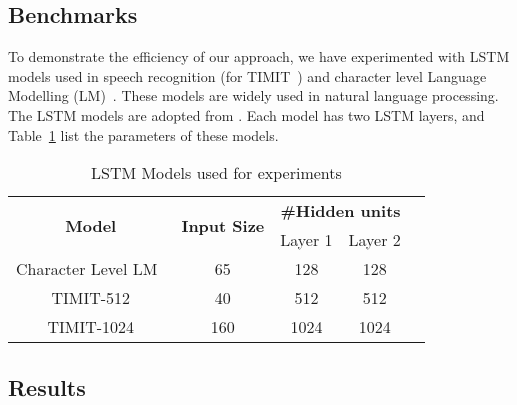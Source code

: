 {\subsection{Benchmarks}
To demonstrate the efficiency of our approach, we have experimented with LSTM models used in speech recognition (for TIMIT~\cite{garofolo1993timit}) and character level Language Modelling (LM)~\cite{sundermeyer2015feedforward}. These models are widely used in natural language processing. The LSTM models are adopted from \cite{azari2020elsa,park2018maximizing,han2017ese}. Each model has two LSTM layers, and Table~\ref{tab:lstmModels} list the parameters of these models.
\begin{table}[htb]
	\centering
	\caption{LSTM Models used for experiments}
	\begin{tabular}{@{}ccccll@{}}
		\toprule
		\multirow{2}{*}{\textbf{Model}} & \multirow{2}{*}{\textbf{Input Size}} & \multicolumn{2}{c}{\textbf{\#Hidden units}} & \multicolumn{2}{l}{\multirow{5}{*}{}} \\ \cmidrule(lr){3-4}
		&                                      & Layer 1              & Layer 2              & \multicolumn{2}{l}{}                  \\ \cmidrule(r){1-4}
		Character Level LM~\cite{azari2020elsa}                              & 65                                   & 128                  & 128                  & \multicolumn{2}{l}{}                  \\ \cmidrule(r){1-4}
		TIMIT-512 \cite{park2018maximizing}                      & 40                                   & 512                  & 512                  & \multicolumn{2}{l}{}                  \\ \cmidrule(r){1-4}
		TIMIT-1024 \cite{han2017ese}                     & 160                                  & 1024                 & 1024                 & \multicolumn{2}{l}{}                  \\ \bottomrule
	\end{tabular}
	\label{tab:lstmModels}
\end{table}
\subsection{Results}
}

